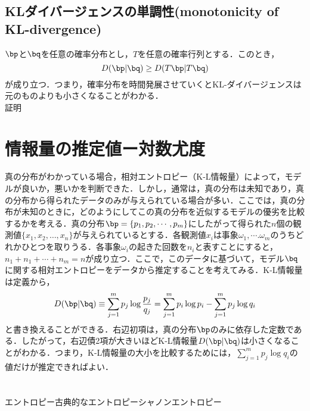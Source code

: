 \subsection{KLダイバージェンスの単調性(monotonicity of KL-divergence)}
$\bp$と$\bq$を任意の確率分布とし，$T$を任意の確率行列とする．このとき，
\begin{equation}
    D(\bp|\bq)\geq D(T\bp|T\bq)
\end{equation}
が成り立つ．つまり，確率分布を時間発展させていくとKL-ダイバージェンスは元のものよりも小さくなることがわかる．\\
証明\\





\section{情報量の推定値ー対数尤度}
真の分布がわかっている場合，相対エントロピー（K-L情報量）によって，モデルが良いか，悪いかを判断できた．しかし，通常は，真の分布は未知であり，真の分布から得られたデータのみが与えられている場合が多い．ここでは，真の分布が未知のときに，どのようにしてこの真の分布を近似するモデルの優劣を比較するかを考える．真の分布$\bp=\{p_1,p_2,\cdots,p_m\}$にしたがって得られた$n$個の観測値$\{x_1,x_2,\ldots,x_n\}$が与えられているとする．各観測値$x_i$は事象$\omega_1,\cdots.\omega_m$のうちどれかひとつを取りうる．各事象$\omega_i$の起きた回数を$n_i$と表すことにすると，$n_1+n_1+\cdots+n_m=n$が成り立つ．ここで，このデータに基づいて，モデル$\bq$に関する相対エントロピーをデータから推定することを考えてみる．K-L情報量は定義から，
\begin{equation}
    D(\bp|\bq)\equiv\sum_{j=1}^{m}p_j\log{\frac{p_j}{q_j}}
    =\sum_{j=1}^{m}p_i\log{p_i}-\sum_{j=1}^{m}p_j\log{q_i}
\end{equation}
と書き換えることができる．右辺初項は，真の分布$\bp$のみに依存した定数である．したがって，右辺債2項が大きいほどK-L情報量$D(\bp|\bq)$は小さくなることがわかる．つまり，K-L情報量の大小を比較するためには，$\sum_{j=1}^{m}p_j\log{q_i}$の値だけが推定できればよい．















\section{}
エントロピー古典的なエントロピーシャノンエントロピー

